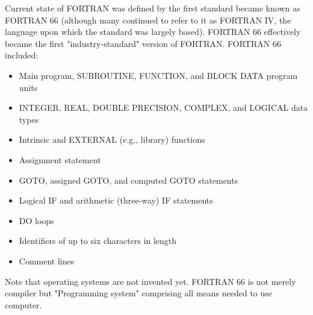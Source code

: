 \documentclass[a4paper]{article}
\begin{document}
Current state of FORTRAN was defined by the first standard became known as FORTRAN 66 (although many continued to refer to it as FORTRAN IV, the language upon which the standard was largely based). FORTRAN 66 effectively became the first "industry-standard" version of FORTRAN. FORTRAN 66 included:
\begin{itemize}
    \item Main program, SUBROUTINE, FUNCTION, and BLOCK DATA program units
    \item INTEGER, REAL, DOUBLE PRECISION, COMPLEX, and LOGICAL data types
    \item Intrinsic and EXTERNAL (e.g., library) functions
    \item Assignment statement
    \item GOTO, assigned GOTO, and computed GOTO statements
    \item Logical IF and arithmetic (three-way) IF statements
    \item DO loops
    \item Identifiers of up to six characters in length
    \item Comment lines
\end {itemize}
Note that operating systems are not invented yet. FORTRAN 66 is not merely compiler but "Programming system" comprising all means needed to use computer.
\end{document}
